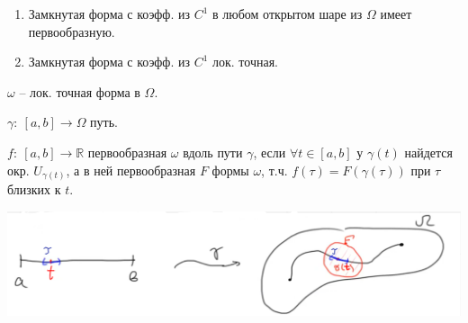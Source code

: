 \begin{consequence}
    \begin{enumerate}
        \item {
            Замкнутая форма с коэфф. из $C^1$ в любом открытом шаре из $\Omega$ имеет первообразную.
        }
        \item {
            Замкнутая форма с коэфф. из $C^1$ лок. точная.
        }
    \end{enumerate}
\end{consequence}
\begin{definition}
    $\omega$ -- лок. точная форма в $\Omega$.

    $\gamma: \ [a, b] \rightarrow \Omega$ путь.

    $f: \ [a, b] \rightarrow \mathbb{R}$ первообразная $\omega$ вдоль пути $\gamma$, если $\forall t \in [a, b]$ у $\gamma(t)$ найдется окр. $U_{\gamma(t)}$, а в ней первообразная $F$ формы $\omega$, т.ч. $f(\tau) = F(\gamma(\tau))$ при $\tau$ близких к $t$.

    \begin{center}
        \includegraphics[width=15cm]{assets/03-intergrals-with-params/difinition-picture.png}
    \end{center}
\end{definition}


